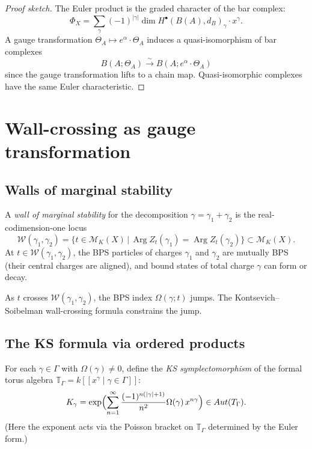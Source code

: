\documentclass[11pt]{article}
\theoremstyle{definition}
\theoremstyle{remark}
\newcommand{\cM}{\mathcal{M}}
\newcommand{\cW}{\mathcal{W}}
\DeclareMathOperator{\Aut}{Aut}
\DeclareMathOperator{\Arg}{Arg}
\begin{document}
\begin{proof}[Proof sketch]
The Euler product is the graded character of the bar complex:
\[
 \Phi_X = \sum_\gamma (-1)^{|\gamma|}
 \dim H^\bullet(B(A), d_B)_\gamma \cdot x^\gamma.
\]
A gauge transformation $\Theta_A \mapsto e^\alpha \cdot \Theta_A$
induces a quasi-isomorphism of bar complexes
\[
 B(A; \Theta_A) \xrightarrow{\;\sim\;} B(A; e^\alpha \cdot \Theta_A)
\]
since the gauge transformation lifts to a chain map.
Quasi-isomorphic complexes have the same Euler characteristic.
\end{proof}

\section{Wall-crossing as gauge transformation}
\label{sec:wc-gauge}

\subsection{Walls of marginal stability}
\label{ssec:walls}

A \emph{wall of marginal stability} for the decomposition
$\gamma = \gamma_1 + \gamma_2$ is the real-codimension-one locus
\begin{equation}\label{eq:wall}
 \cW(\gamma_1, \gamma_2)
 = \bigl\{ t \in \cM_K(X)
 \,\big|\, \Arg Z_t(\gamma_1) = \Arg Z_t(\gamma_2) \bigr\}
 \subset \cM_K(X).
\end{equation}
At $t \in \cW(\gamma_1, \gamma_2)$, the BPS particles of charges
$\gamma_1$ and $\gamma_2$ are mutually BPS (their central charges are
aligned), and bound states of total charge $\gamma$ can form or decay.

As $t$ crosses $\cW(\gamma_1, \gamma_2)$, the BPS index $\Omega(\gamma; t)$
jumps. The Kontsevich--Soibelman wall-crossing formula constrains the jump.

\subsection{The KS formula via ordered products}
\label{ssec:ks-formula}

For each $\gamma \in \Gamma$ with $\Omega(\gamma) \neq 0$, define the
\emph{KS symplectomorphism} of the formal torus algebra
$\mathbb{T}_\Gamma = k[\![x^\gamma \mid \gamma \in \Gamma]\!]$:
\begin{equation}\label{eq:ks-symplecto}
 K_\gamma = \exp\Bigl(
 \sum_{n=1}^{\infty} \frac{(-1)^{n(|\gamma|+1)}}{n^2}
 \Omega(\gamma) \, x^{n\gamma}
 \Bigr) \in \Aut(\mathbb{T}_\Gamma).
\end{equation}
(Here the exponent acts via the Poisson bracket on $\mathbb{T}_\Gamma$
determined by the Euler form.)
\end{document}
